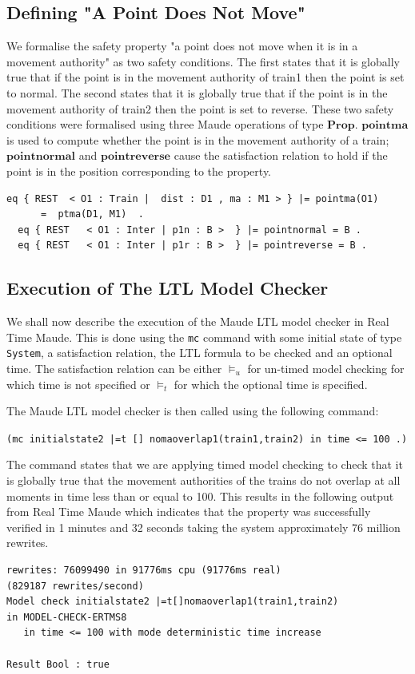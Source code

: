 \subsection*{Defining "A Point Does Not Move"}
We formalise the safety property "a point does not move when it is in a movement authority" as two safety conditions. The first states that it is globally true that if the point is in the movement authority of train1 then the point is set to normal. The second states that it is globally true that if the point is in the movement authority of train2 then the point is set to reverse. These two safety conditions were formalised using three Maude operations of type $\mathbf{Prop}$. $\mathbf{pointma}$ is used to compute whether the point is in the movement authority of a train; $\mathbf{pointnormal}$ and $\mathbf{pointreverse}$ cause the satisfaction relation to hold if the point is in the position corresponding to the property. 

\begin{lstlisting}[caption = The point properties]
  eq { REST  < O1 : Train |  dist : D1 , ma : M1 > } |= pointma(O1) 
      =  ptma(D1, M1)  .
  eq { REST   < O1 : Inter | p1n : B >  } |= pointnormal = B .
  eq { REST   < O1 : Inter | p1r : B >  } |= pointreverse = B .
\end{lstlisting}

\subsection{Execution of The LTL Model Checker}

We shall now describe the execution of the Maude LTL model checker in Real Time Maude. This is done using the \texttt{mc} command with some initial state of type \texttt{System}, a satisfaction relation, the LTL formula to be checked and an optional time. The satisfaction relation can be either $\models_u$ for un-timed model checking for which time is not specified or $\models_t$ for which the optional time is specified.

The Maude LTL model checker is then called using the following command:

\begin{center}
\texttt{(mc initialstate2 |=t [] nomaoverlap1(train1,train2) in time <= 100 .)}
\end{center}
The command states that we are applying timed model checking to check that it is globally true that the movement authorities of the trains do not overlap at all moments in time less than or equal to 100. This results in the following output from Real Time Maude which indicates that the property was successfully verified in 1 minutes and 32 seconds taking the system approximately 76 million rewrites.
\begin{lstlisting}[caption = No overlapping movement authorities model checking result]
rewrites: 76099490 in 91776ms cpu (91776ms real) 
(829187 rewrites/second)
Model check initialstate2 |=t[]nomaoverlap1(train1,train2)
in MODEL-CHECK-ERTMS8
   in time <= 100 with mode deterministic time increase

Result Bool : true
\end{lstlisting}

